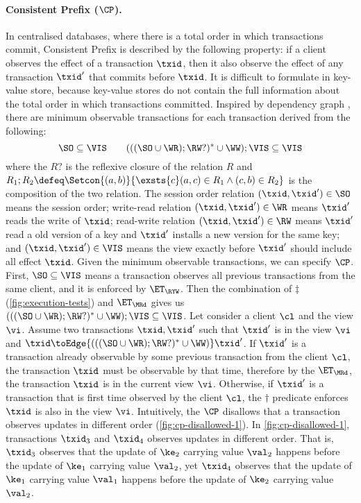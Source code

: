 \paragraph{Consistent Prefix ($\CP$).}
\label{para:cp}
In centralised databases, where there is a total order in which transactions commit, 
Consistent Prefix is described by the following property: 
if a client observes the effect of a transaction $\txid$,
then it also observe the effect of any transaction $\txid'$ that commits before $\txid$.
It is difficult to formulate in key-value store,
because key-value stores do not contain the full information about the total order in which transactions committed. 
Inspired by dependency graph \cite{.....},
there are minimum observable transactions for each transaction derived from the following:
\[
    \SO  \subseteq  \VIS \qquad
    ( ( ( \SO \cup \WR ) ; \RW? )^* \cup \WW ) ; \VIS \subseteq \VIS
\]
where the \( R? \) is the reflexive closure of the relation \( R \) 
and \( R_1 ; R_2 \defeq \Setcon{(a,b)}{\exsts{c} (a,c) \in R_1 \land (c,b) \in R_2 } \) is the composition of the two relation.
The session order relation \( (\txid, \txid') \in \SO \) means the session order;
write-read relation \( (\txid, \txid') \in \WR \) means \( \txid' \) reads the write of \( \txid \);
read-write relation \( (\txid, \txid') \in \RW \) means \( \txid' \) read a old version of a key 
and \( \txid' \) installs a new version for the same key;
and \( (\txid, \txid') \in \VIS \) means the view exactly before \( \txid' \) should include all effect \( \txid \).
Given the minimum observable transactions, we can specify $\CP$. 
First, \( \SO \subseteq \VIS \) means a transaction observes all previous transactions from the same client,
and it is enforced by \( \ET_\RYW \).
Then the combination of \( \ddagger\) (\cref{fig:execution-tests}) and \( \ET_\MRd \) gives us \( ( ( ( \SO \cup \WR ) ; \RW? )^* \cup \WW ) ; \VIS \subseteq \VIS \).
Let consider a client \( \cl \) and the view \( \vi \).
Assume two transactions \( \txid, \txid' \)  such that \( \txid' \) is in the view \( \vi \) and \( \txid \toEdge{( ( ( \SO \cup \WR ) ; \RW? )^* \cup \WW )} \txid' \).
If \( \txid' \) is a transaction already observable by some previous transaction from the client \( \cl \), 
the transaction \( \txid \) must be observable by that time,
therefore by the \( \ET_\MRd \), the transaction \( \txid \) is in the current view \( \vi \).
Otherwise, if \( \txid' \) is a transaction that is first time observed by the client \( \cl \),
the \( \dagger \) predicate enforces \( \txid \) is also in the view \( \vi \).
Intuitively, the \( \CP \) disallows that a transaction observes updates in different order (\cref{fig:cp-disallowed-1}).
In \cref{fig:cp-disallowed-1}, transactions $\txid_{3}$ and \( \txid_4 \) observes updates in different order.
That is, \( \txid_3 \) observes that the update of $\ke_2$ carrying value $\val_2$ happens before the update of $\ke_1$ carrying value $\val_2$,
yet $\txid_{4}$ observes that the update of $\ke_1$ carrying value $\val_1$ happens before the update of $\ke_2$ carrying value $\val_2$. 
